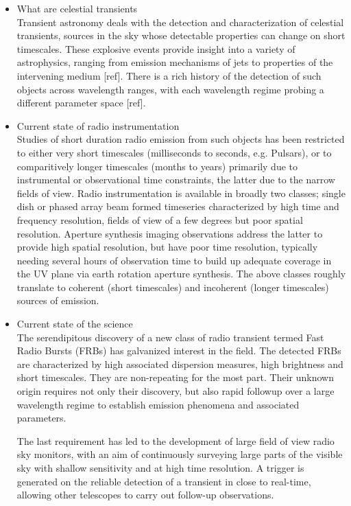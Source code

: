 \documentclass{ws-jai}
\begin{document}
\begin{itemize}
\item What are celestial transients \\
\noindent Transient astronomy  deals with the detection  and characterization of
celestial transients, sources in the  sky whose detectable properties can change
on short timescales.   These explosive events provide insight into  a variety of
astrophysics,  ranging from  emission mechanisms  of jets  to properties  of the
intervening medium  [ref].  There  is a  rich history of  the detection  of such
objects  across  wavelength  ranges,  with  each  wavelength  regime  probing  a
different parameter space [ref].

\item Current  state of  radio instrumentation\\
Studies of short  duration radio emission from such objects  has been restricted
to either very  short timescales (milliseconds to seconds, e.g.  Pulsars), or to
comparitively longer timescales (months to  years) primarily due to instrumental
or observational time constraints, the latter  due to the narrow fields of view.
Radio instrumentation is available in broadly two classes; single dish or phased
array  beam  formed   timeseries  characterized  by  high   time  and  frequency
resolution,  fields of  view  of  a few  degrees  but  poor spatial  resolution.
Aperture  synthesis imaging  observations  address the  latter  to provide  high
spatial resolution,  but have  poor time  resolution, typically  needing several
hours of  observation time  to build up  adequate coverage in  the UV  plane via
earth  rotation aperture  synthesis.   The above  classes  roughly translate  to
coherent  (short  timescales)  and  incoherent (longer  timescales)  sources  of
emission.

\item Current state of the science \\
The serendipitous discovery of a new  class of radio transient termed Fast Radio
Bursts  (FRBs) has  galvanized  interest in  the field.  The  detected FRBs  are
characterized by high associated dispersion  measures, high brightness and short
timescales.  They are  non-repeating for  the  most part.  Their unknown  origin
requires  not  only their  discovery,  but  also  rapid  followup over  a  large
wavelength regime to establish emission phenomena and associated parameters.

The last requirement has led to the development of large field of view radio sky
monitors, with an  aim of continuously surveying large parts  of the visible sky
with shallow sensitivity and at high  time resolution. A trigger is generated on
the reliable  detection of  a transient  in close  to real-time,  allowing other
telescopes to carry out follow-up observations.


\end{itemize}
\end{document}
